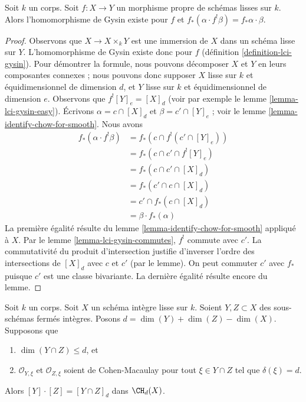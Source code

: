 \begin{lemma}
\label{lemma-projection-formula}
Soit $k$ un corps. Soit $f : X \to Y$ un morphisme propre de schémas lisses
sur $k$. Alors l'homomorphisme de Gysin existe pour $f$ et
$f_*(\alpha \cdot f^!\beta) = f_*\alpha \cdot \beta$.
\end{lemma}

\begin{proof}
Observons que $X \to X \times_k Y$ est une immersion de $X$ dans un schéma
lisse sur $Y$. L'homomorphisme de Gysin existe donc pour $f$
(définition \ref{definition-lci-gysin}).
Pour démontrer la formule, nous pouvons décomposer $X$ et $Y$ en leurs
composantes connexes ; nous pouvons donc supposer $X$ lisse sur $k$
et équidimensionnel de dimension $d$, et $Y$ lisse sur $k$
et équidimensionnel de dimension $e$. Observons que
$f^![Y]_e = [X]_d$ (voir par exemple le lemme \ref{lemma-lci-gysin-easy}).
Écrivons $\alpha = c \cap [X]_d$ et $\beta = c' \cap [Y]_e$ ;
voir le lemme \ref{lemma-identify-chow-for-smooth}. Nous avons
\begin{align*}
f_*(\alpha \cdot f^!\beta)
& =
f_*(c \cap f^!(c' \cap [Y]_e)) \\
& =
f_*(c \cap c' \cap f^![Y]_e) \\
& =
f_*(c \cap c' \cap [X]_d) \\
& =
f_*(c' \cap c \cap [X]_d) \\
& =
c' \cap f_*(c \cap [X]_d) \\
& =
\beta \cdot f_*(\alpha)
\end{align*}
La première égalité résulte du lemme \ref{lemma-identify-chow-for-smooth}
appliqué à $X$. Par le lemme \ref{lemma-lci-gysin-commutes}, $f^!$
commute avec $c'$. La commutativité du produit
d'intersection justifie d'inverser l'ordre des intersections de $[X]_d$ avec $c$ et $c'$
(par le lemme). On peut commuter $c'$ avec $f_*$ puisque $c'$
est une classe bivariante. La dernière égalité résulte encore du lemme.
\end{proof}

\begin{lemma}
\label{lemma-intersect-properly}
Soit $k$ un corps. Soit $X$ un schéma intègre lisse sur $k$.
Soient $Y, Z \subset X$ des sous-schémas fermés intègres. Posons
$d = \dim(Y) + \dim(Z) - \dim(X)$. Supposons que
\begin{enumerate}
\item $\dim(Y \cap Z) \leq d$, et
\item $\mathcal{O}_{Y, \xi}$ et $\mathcal{O}_{Z, \xi}$
soient de Cohen-Macaulay pour tout $\xi \in Y \cap Z$ tel que
$\delta(\xi) = d$.
\end{enumerate}
Alors $[Y] \cdot [Z] = [Y \cap Z]_d$ dans $\CH_d(X)$.
\end{lemma}

